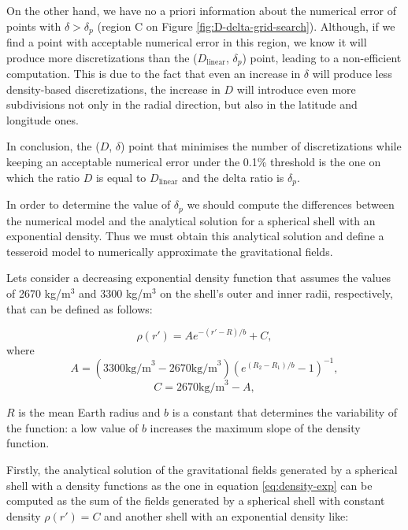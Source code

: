 \documentclass[extra]{gji}
\begin{document}
On the other hand, we have no a priori information about the numerical 
error of points with $\delta > \delta_p$ (region C on 
Figure \ref{fig:D-delta-grid-search}).
Although, if we find a point with acceptable numerical error in this 
region, we know it will produce more discretizations than the 
($D_\text{linear}$, $\delta_p$) point, leading to a non-efficient 
computation.
This is due to the fact that even an increase in $\delta$ will produce 
less density-based discretizations, the increase in $D$ will introduce 
even more subdivisions not only in the radial direction, but 
also in the latitude and longitude ones.

In conclusion, the ($D$, $\delta$) point that minimises the number of 
discretizations while keeping an acceptable numerical error under the 
0.1\% threshold is the one on which the ratio $D$ is equal to 
$D_\text{linear}$ and the delta ratio is $\delta_p$.

In order to determine the value of $\delta_p$ we should compute the 
differences between the numerical model and the analytical solution for 
a spherical shell with an exponential density.
Thus we must obtain this analytical solution and define a tesseroid 
model to numerically approximate the gravitational fields.

Lets consider a decreasing exponential density function that assumes 
the values of 2670 kg/m$^3$ and 3300 kg/m$^3$ on the shell's outer and 
inner radii, respectively, that can be defined as follows:

\begin{equation}
    \rho(r') = A e^{-(r' - R)/b} + C,
\label{eq:density-exp}
\end{equation}
\noindent where
\begin{equation}
    A =
    (3300 \text{kg/m}^3 - 2670 \text{kg/m}^3)
    \left( e^{( R_2 - R_1 )/b} - 1 \right)^{-1},
\end{equation}
\begin{equation}
    C =
    2670 \text{kg/m}^3 - A,
\end{equation}

\noindent $R$ is the mean Earth radius and $b$ is a constant 
that determines the variability of the function: a low value of $b$ 
increases the maximum slope of the density function.

Firstly, the analytical solution of the gravitational fields generated 
by a spherical shell with a density functions as the one in equation 
\ref{eq:density-exp} can be computed as the sum of the fields generated 
by a spherical shell with constant density $\rho(r') = C$ and another 
shell with an exponential density like:
\end{document}
